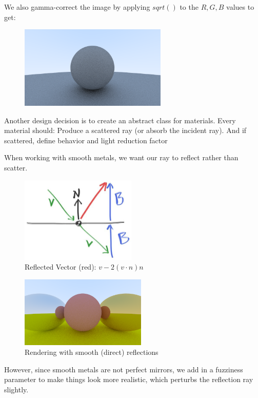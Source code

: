 \documentclass[conference]{IEEEtran}
\begin{document}
We also gamma-correct the image by applying $sqrt()$ to the $R,G,B$ values to get:

\begin{figure}[h]
\includegraphics[width=7cm]{images/gamma-correction.png}
\centering
\end{figure}

Another design decision is to create an abstract class for materials. Every material should:
Produce a scattered ray (or absorb the incident ray). And if scattered, define behavior and light reduction factor

When working with smooth metals, we want our ray to reflect rather than scatter.

\begin{figure}[h]
\includegraphics[width=5.5cm]{images/reflect_vector.jpg}\\
Reflected Vector (red): $v - 2(v \cdot n)n$
\centering
\end{figure}

\begin{figure}[h]
\includegraphics[width=6cm]{images/metal_shiny.png}\\
Rendering with smooth (direct) reflections
\centering
\end{figure}

However, since smooth metals are not perfect mirrors, we add in a fuzziness parameter to make things look more realistic, which perturbs the reflection ray slightly.
\end{document}
